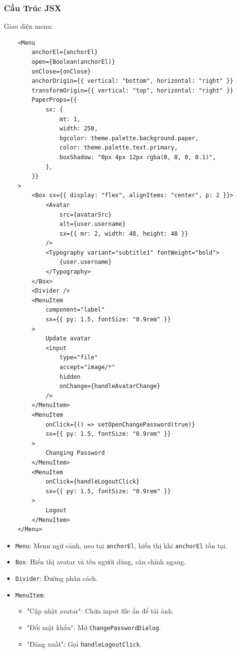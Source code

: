             \subsubsection{Cấu Trúc JSX}
                \hspace*{0.6cm}Giao diện menu:
                \begin{lstlisting}
    <Menu
        anchorEl={anchorEl}
        open={Boolean(anchorEl)}
        onClose={onClose}
        anchorOrigin={{ vertical: "bottom", horizontal: "right" }}
        transformOrigin={{ vertical: "top", horizontal: "right" }}
        PaperProps={{
            sx: {
                mt: 1,
                width: 250,
                bgcolor: theme.palette.background.paper,
                color: theme.palette.text.primary,
                boxShadow: "0px 4px 12px rgba(0, 0, 0, 0.1)",
            },
        }}
    >
        <Box sx={{ display: "flex", alignItems: "center", p: 2 }}>
            <Avatar
                src={avatarSrc}
                alt={user.username}
                sx={{ mr: 2, width: 48, height: 48 }}
            />
            <Typography variant="subtitle1" fontWeight="bold">
                {user.username}
            </Typography>
        </Box>
        <Divider />
        <MenuItem
            component="label"
            sx={{ py: 1.5, fontSize: "0.9rem" }}
        >
            Update avatar
            <input
                type="file"
                accept="image/*"
                hidden
                onChange={handleAvatarChange}
            />
        </MenuItem>
        <MenuItem
            onClick={() => setOpenChangePassword(true)}
            sx={{ py: 1.5, fontSize: "0.9rem" }}
        >
            Changing Password
        </MenuItem>
        <MenuItem
            onClick={handleLogoutClick}
            sx={{ py: 1.5, fontSize: "0.9rem" }}
        >
            Logout
        </MenuItem>
    </Menu>
                \end{lstlisting}
                \begin{itemize}
                    \item \texttt{Menu}: Menu ngữ cảnh, neo tại \texttt{anchorEl}, hiển thị khi \texttt{anchorEl} tồn tại.
                    \item \texttt{Box}: Hiển thị avatar và tên người dùng, căn chỉnh ngang.
                    \item \texttt{Divider}: Đường phân cách.
                    \item \texttt{MenuItem}:
                    \begin{itemize}
                        \item "Cập nhật avatar": Chứa input file ẩn để tải ảnh.
                        \item "Đổi mật khẩu": Mở \texttt{ChangePasswordDialog}.
                        \item "Đăng xuất": Gọi \texttt{handleLogoutClick}.
                    \end{itemize}
                \end{itemize}

